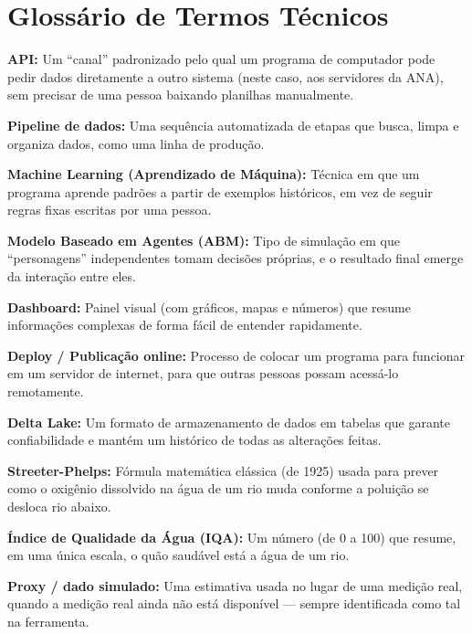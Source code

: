 \documentclass[11pt,a4paper]{article}
\begin{document}
\section{Glossário de Termos Técnicos}

\noindent\textbf{API:} Um ``canal'' padronizado pelo qual um programa de computador pode pedir dados diretamente a outro sistema (neste caso, aos servidores da ANA), sem precisar de uma pessoa baixando planilhas manualmente.

\noindent\textbf{Pipeline de dados:} Uma sequência automatizada de etapas que busca, limpa e organiza dados, como uma linha de produção.

\noindent\textbf{Machine Learning (Aprendizado de Máquina):} Técnica em que um programa aprende padrões a partir de exemplos históricos, em vez de seguir regras fixas escritas por uma pessoa.

\noindent\textbf{Modelo Baseado em Agentes (ABM):} Tipo de simulação em que ``personagens'' independentes tomam decisões próprias, e o resultado final emerge da interação entre eles.

\noindent\textbf{Dashboard:} Painel visual (com gráficos, mapas e números) que resume informações complexas de forma fácil de entender rapidamente.

\noindent\textbf{Deploy / Publicação online:} Processo de colocar um programa para funcionar em um servidor de internet, para que outras pessoas possam acessá-lo remotamente.

\noindent\textbf{Delta Lake:} Um formato de armazenamento de dados em tabelas que garante confiabilidade e mantém um histórico de todas as alterações feitas.

\noindent\textbf{Streeter-Phelps:} Fórmula matemática clássica (de 1925) usada para prever como o oxigênio dissolvido na água de um rio muda conforme a poluição se desloca rio abaixo.

\noindent\textbf{Índice de Qualidade da Água (IQA):} Um número (de 0 a 100) que resume, em uma única escala, o quão saudável está a água de um rio.

\noindent\textbf{Proxy / dado simulado:} Uma estimativa usada no lugar de uma medição real, quando a medição real ainda não está disponível — sempre identificada como tal na ferramenta.
\end{document}
